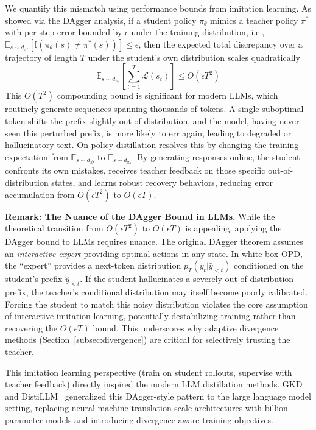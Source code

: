\documentclass{article} %
\newcommand{\pteacher}{p_T}
\begin{document}
We quantify this mismatch using performance bounds from imitation learning. As \citet{ross2011reduction} showed via the DAgger analysis, if a student policy $\pi_\theta$ mimics a teacher policy $\pi^*$ with per-step error bounded by $\epsilon$ under the training distribution, i.e., $\mathbb{E}_{s \sim d_{\pi^*}}[\mathbb{I}(\pi_\theta(s) \neq \pi^*(s))] \le \epsilon$, then the expected total discrepancy over a trajectory of length $T$ under the student's own distribution scales quadratically
\begin{equation}
    \mathbb{E}_{s \sim d_{\pi_\theta}} \left[ \sum_{t=1}^T \mathcal{L}(s_t) \right] \le O(\epsilon T^2)
\end{equation}
This $O(T^2)$ compounding bound is significant for modern LLMs, which routinely generate sequences spanning thousands of tokens. A single suboptimal token shifts the prefix slightly out-of-distribution, and the model, having never seen this perturbed prefix, is more likely to err again, leading to degraded or hallucinatory text. On-policy distillation resolves this by changing the training expectation from $\mathbb{E}_{s \sim d_{\mathcal{D}}}$ to $\mathbb{E}_{s \sim d_{\pi_\theta}}$. By generating responses online, the student confronts its own mistakes, receives teacher feedback on those specific out-of-distribution states, and learns robust recovery behaviors, reducing error accumulation from $O(\epsilon T^2)$ to $O(\epsilon T)$.

\textbf{Remark: The Nuance of the DAgger Bound in LLMs.} While the theoretical transition from $O(\epsilon T^2)$ to $O(\epsilon T)$ is appealing, applying the DAgger bound to LLMs requires nuance. The original DAgger theorem assumes an \textit{interactive expert} providing optimal actions in any state. In white-box OPD, the ``expert'' provides a next-token distribution $\pteacher(y_t | \hat{y}_{<t})$ conditioned on the student's prefix $\hat{y}_{<t}$. If the student hallucinates a severely out-of-distribution prefix, the teacher's conditional distribution may itself become poorly calibrated. Forcing the student to match this noisy distribution violates the core assumption of interactive imitation learning, potentially destabilizing training rather than recovering the $O(\epsilon T)$ bound. This underscores why adaptive divergence methods (Section~\ref{subsec:divergence}) are critical for selectively trusting the teacher.

This imitation learning perspective (train on student rollouts, supervise with teacher feedback) directly inspired the modern LLM distillation methods. GKD \citep{2306.13649} and DistiLLM~\citep{2402.03898} generalized this DAgger-style pattern to the large language model setting, replacing neural machine translation-scale architectures with billion-parameter models and introducing divergence-aware training objectives.
\end{document}
